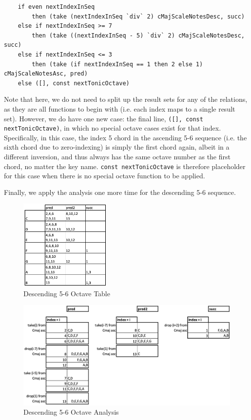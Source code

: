 \documentclass{report}
\begin{document}
\begin{verbatim}
    if even nextIndexInSeq 
        then (take (nextIndexInSeq `div` 2) cMajScaleNotesDesc, succ)
    else if nextIndexInSeq >= 7  
        then (take ((nextIndexInSeq - 5) `div` 2) cMajScaleNotesDesc, succ)
    else if nextIndexInSeq <= 3 
        then (take (if nextIndexInSeq == 1 then 2 else 1) cMajScaleNotesAsc, pred)
    else ([], const nextTonicOctave)  
\end{verbatim}

Note that here, we do not need to split up the  result sets for any of the relations,  as they are all functions to begin with (i.e. each index maps to a single result set). However, we do have one new case: the final line, \verb.([], const nextTonicOctave)., in which no special octave cases exist for that index. Specifically, in this case, the index 5 chord in the ascending 5-6 sequence (i.e. the sixth chord due to zero-indexing) is simply the first chord again, albeit in a different inversion, and thus always has the same octave number as the first chord, no matter the key name. \verb.const nextTonicOctave. is therefore placeholder for this case when there is  no special octave function to be applied.
         
Finally, we apply the analysis one more time for the descending 5-6 sequence.

\begin{figure}[h!]
\centering
\includegraphics[width=0.4\textwidth]{images/desc56_octave_grid}
  \caption{Descending 5-6 Octave Table}
\end{figure}

\begin{figure}[h!]
\centering
\includegraphics[width=\textwidth]{images/desc56_octave_analysis}
  \caption{Descending 5-6 Octave Analysis}
\end{figure}
\newpage
\end{document}
